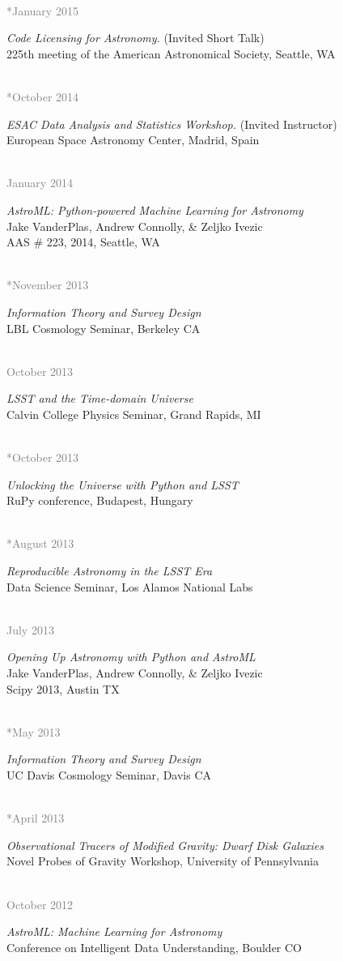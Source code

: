 \documentclass{article} %
\newlength\sidebarwidth
\newcommand{\dateonly}[2][]
	 {\begin{minipage}{\textwidth}
	 \vspace*{.4\baselineskip}
         \nopagebreak\hspace{0in}%
         \nopagebreak\begin{minipage}[t]{\sidebarwidth - .2cm}
         \raggedleft {~}
         {\\[-\baselineskip] \textcolor{gray}{\footnotesize #1}}
	 \end{minipage}%
	 \hfill
	 \begin{minipage}[t]{\linewidth - \sidebarwidth}
	 #2%
	 \end{minipage}%
	 \vspace*{.2\baselineskip plus 1\baselineskip minus
	 .2\baselineskip}%
	 \end{minipage}}
\begin{document}
  \dateonly[**January 2015]{
    {\it Code Licensing for Astronomy.} (Invited Short Talk)\\
    225th meeting of the American Astronomical Society, Seattle, WA
  }

  \dateonly[**October 2014]{
    {\it ESAC Data Analysis and Statistics Workshop.} (Invited Instructor)\\
    European Space Astronomy Center, Madrid, Spain
  }

  \dateonly[January 2014]{
    {\it AstroML: Python-powered Machine Learning for Astronomy}\\
    Jake VanderPlas, Andrew Connolly, \& Zeljko Ivezic\\
    AAS \# 223, 2014, Seattle, WA
  }

  \dateonly[**November 2013]{
    {\it Information Theory and Survey Design}\\
    LBL Cosmology Seminar, Berkeley CA
  }

  \dateonly[October 2013]{
    {\it LSST and the Time-domain Universe}\\
    Calvin College Physics Seminar, Grand Rapids, MI
  }

  \dateonly[**October 2013]{
    {\it Unlocking the Universe with Python and LSST}\\
    RuPy conference, Budapest, Hungary
  }

  \dateonly[**August 2013]{
    {\it Reproducible Astronomy in the LSST Era}\\
    Data Science Seminar, Los Alamos National Labs
  }

  \dateonly[July 2013]{
    {\it Opening Up Astronomy with Python and AstroML}\\
    Jake VanderPlas, Andrew Connolly, \& Zeljko Ivezic\\
    Scipy 2013, Austin TX
  }

  \dateonly[**May 2013]{
    {\it Information Theory and Survey Design}\\
    UC Davis Cosmology Seminar, Davis CA
  }

  \dateonly[**April 2013]{
    {\it Observational Tracers of Modified Gravity: Dwarf Disk Galaxies}\\
    Novel Probes of Gravity Workshop, University of Pennsylvania
  }

  \dateonly[October 2012]{
    {\it AstroML: Machine Learning for Astronomy}\\
    Conference on Intelligent Data Understanding, Boulder CO
  }
\end{document}
